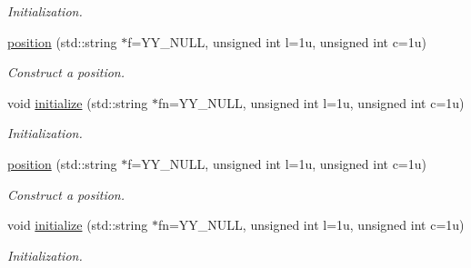 \begin{DoxyCompactItemize}
\begin{DoxyCompactList}\small\item\em Initialization. \end{DoxyCompactList}\item 
\hypertarget{classyy_1_1position_a636b0788d4eb92d6cf8fb7d0094feb2b}{\hyperlink{classyy_1_1position_a636b0788d4eb92d6cf8fb7d0094feb2b}{position} (std\-::string $\ast$f=Y\-Y\-\_\-\-N\-U\-L\-L, unsigned int l=1u, unsigned int c=1u)}\label{classyy_1_1position_a636b0788d4eb92d6cf8fb7d0094feb2b}

\begin{DoxyCompactList}\small\item\em Construct a position. \end{DoxyCompactList}\item 
\hypertarget{classyy_1_1position_add807c5b2364f8842ebd565cd1691d5b}{void \hyperlink{classyy_1_1position_add807c5b2364f8842ebd565cd1691d5b}{initialize} (std\-::string $\ast$fn=Y\-Y\-\_\-\-N\-U\-L\-L, unsigned int l=1u, unsigned int c=1u)}\label{classyy_1_1position_add807c5b2364f8842ebd565cd1691d5b}

\begin{DoxyCompactList}\small\item\em Initialization. \end{DoxyCompactList}\item 
\hypertarget{classyy_1_1position_a636b0788d4eb92d6cf8fb7d0094feb2b}{\hyperlink{classyy_1_1position_a636b0788d4eb92d6cf8fb7d0094feb2b}{position} (std\-::string $\ast$f=Y\-Y\-\_\-\-N\-U\-L\-L, unsigned int l=1u, unsigned int c=1u)}\label{classyy_1_1position_a636b0788d4eb92d6cf8fb7d0094feb2b}

\begin{DoxyCompactList}\small\item\em Construct a position. \end{DoxyCompactList}\item 
\hypertarget{classyy_1_1position_add807c5b2364f8842ebd565cd1691d5b}{void \hyperlink{classyy_1_1position_add807c5b2364f8842ebd565cd1691d5b}{initialize} (std\-::string $\ast$fn=Y\-Y\-\_\-\-N\-U\-L\-L, unsigned int l=1u, unsigned int c=1u)}\label{classyy_1_1position_add807c5b2364f8842ebd565cd1691d5b}

\begin{DoxyCompactList}\small\item\em Initialization. \end{DoxyCompactList}\end{DoxyCompactItemize}
